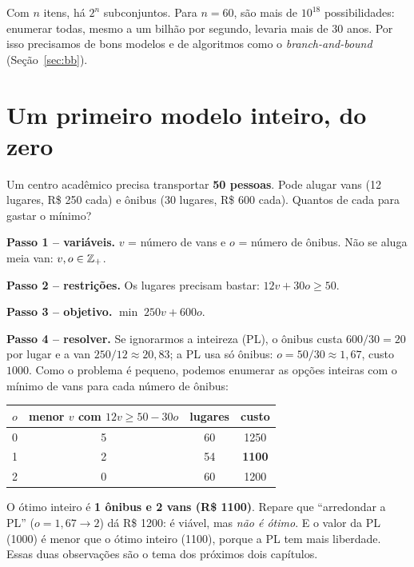 \begin{atencao}
Com $n$ itens, há $2^n$ subconjuntos. Para $n=60$, são mais de $10^{18}$ possibilidades: enumerar todas, mesmo a
um bilhão por segundo, levaria mais de 30 anos. Por isso precisamos de bons modelos e de algoritmos como o
\emph{branch-and-bound} (Seção~\ref{sec:bb}).
\end{atencao}

\section{Um primeiro modelo inteiro, do zero}

\begin{exemplo}
Um centro acadêmico precisa transportar \textbf{50 pessoas}. Pode alugar vans (12 lugares, R\$ 250 cada) e ônibus
(30 lugares, R\$ 600 cada). Quantos de cada para gastar o mínimo?

\textbf{Passo 1 -- variáveis.} $v$ = número de vans e $o$ = número de ônibus. Não se aluga meia van:
$v,o\in\mathbb{Z}_+$.

\textbf{Passo 2 -- restrições.} Os lugares precisam bastar: $12v + 30o \ge 50$.

\textbf{Passo 3 -- objetivo.} $\min\; 250v + 600o$.

\textbf{Passo 4 -- resolver.} Se ignorarmos a inteireza (PL), o ônibus custa $600/30=20$ por lugar e a van
$250/12\approx 20{,}83$; a PL usa só ônibus: $o=50/30\approx1{,}67$, custo $1000$. Como o problema é pequeno,
podemos enumerar as opções inteiras com o mínimo de vans para cada número de ônibus:
\begin{center}
\begin{tabular}{cccc}
\toprule
$o$ & menor $v$ com $12v \ge 50-30o$ & lugares & custo\\
\midrule
0 & 5 & 60 & 1250\\
1 & 2 & 54 & \textbf{1100}\\
2 & 0 & 60 & 1200\\
\bottomrule
\end{tabular}
\end{center}
O ótimo inteiro é \textbf{1 ônibus e 2 vans (R\$ 1100)}. Repare que ``arredondar a PL'' ($o=1{,}67\to2$) dá R\$ 1200:
é viável, mas \emph{não é ótimo}. E o valor da PL (1000) é menor que o ótimo inteiro (1100), porque a PL tem mais
liberdade. Essas duas observações são o tema dos próximos dois capítulos.
\end{exemplo}

